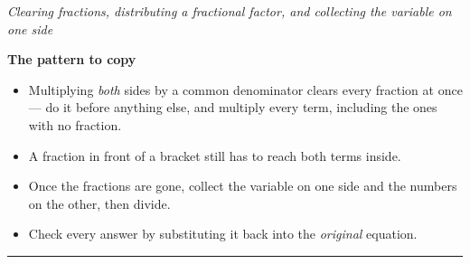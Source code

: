 \documentclass[12pt]{article}
\newlength{\subind}\setlength{\subind}{1.1cm}
\newlength{\subsep}\setlength{\subsep}{1.6cm}
\begin{document}

\begin{center}
\textit{Clearing fractions, distributing a fractional factor, and collecting the variable on one side}
\end{center}

\vspace{0.1cm}
\noindent\textbf{The pattern to copy}
\begin{itemize}[leftmargin=0.9cm, itemsep=1pt, topsep=2pt]
  \item Multiplying \emph{both} sides by a common denominator clears every fraction at once ---
        do it before anything else, and multiply every term, including the ones with no fraction.
  \item A fraction in front of a bracket still has to reach both terms inside.
  \item Once the fractions are gone, collect the variable on one side and the numbers on the other,
        then divide.
  \item Check every answer by substituting it back into the \emph{original} equation.
\end{itemize}

\vspace{0.15cm}
\noindent\rule{\linewidth}{0.4pt}












\end{document}
